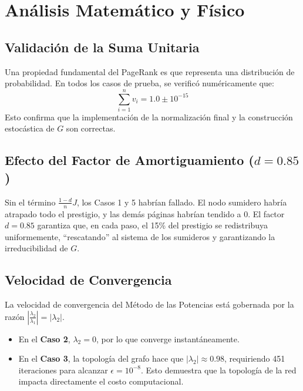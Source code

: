 \documentclass[12pt,a4paper]{article}
\theoremstyle{definition}
\begin{document}
\section{An\'{a}lisis Matem\'{a}tico y F\'{i}sico}\label{sec:analisis}

\subsection{Validaci\'{o}n de la Suma Unitaria}
Una propiedad fundamental del PageRank es que representa una distribuci\'{o}n de probabilidad. En todos los casos de prueba, se verific\'{o} num\'{e}ricamente que:
\begin{equation}
\sum_{i=1}^{n} v_i = 1.0 \pm 10^{-15}
\end{equation}
Esto confirma que la implementaci\'{o}n de la normalizaci\'{o}n final y la construcci\'{o}n estoc\'{a}stica de $G$ son correctas.

\subsection{Efecto del Factor de Amortiguamiento ($d = 0.85$)}
Sin el t\'{e}rmino $\frac{1-d}{n}J$, los Casos 1 y 5 habr\'{i}an fallado. El nodo sumidero habr\'{i}a atrapado todo el prestigio, y las dem\'{a}s p\'{a}ginas habr\'{i}an tendido a 0. El factor $d=0.85$ garantiza que, en cada paso, el 15\% del prestigio se redistribuya uniformemente, ``rescatando'' al sistema de los sumideros y garantizando la irreducibilidad de $G$.

\subsection{Velocidad de Convergencia}
La velocidad de convergencia del M\'{e}todo de las Potencias est\'{a} gobernada por la raz\'{o}n $\left|\frac{\lambda_2}{\lambda_1}\right| = |\lambda_2|$. 
\begin{itemize}
    \item En el \textbf{Caso 2}, $\lambda_2 = 0$, por lo que converge instant\'{a}neamente.
    \item En el \textbf{Caso 3}, la topolog\'{i}a del grafo hace que $|\lambda_2| \approx 0.98$, requiriendo 451 iteraciones para alcanzar $\epsilon = 10^{-8}$. Esto demuestra que la topolog\'{i}a de la red impacta directamente el costo computacional.
\end{itemize}

\end{document}
